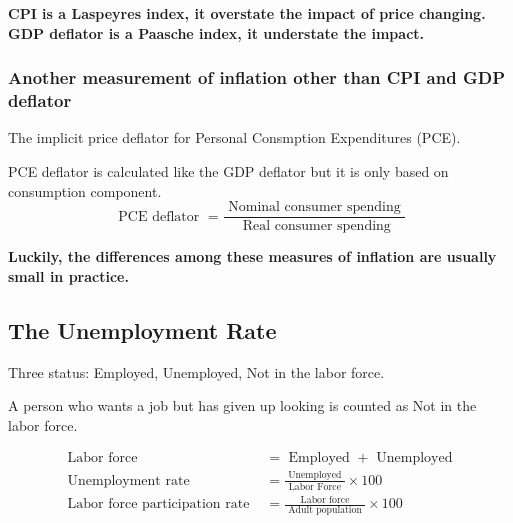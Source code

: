 \documentclass[12pt]{article}
\begin{document}
{\textbf {CPI is a Laspeyres index, it overstate the impact of price changing.}}\\
{\textbf {GDP deflator is a Paasche index, it understate the impact.}}


\subsubsection{Another measurement of inflation other than CPI and GDP deflator}
The implicit price deflator for Personal Consmption Expenditures (PCE).

PCE deflator is calculated like the GDP deflator but it is only based on consumption
component.
\begin{equation*}
\text{ PCE deflator } = \frac{\text{ Nominal consumer spending }}{\text{ Real 
consumer spending}}
\end{equation*}


{\textbf {Luckily, the differences among these measures of inflation are usually
small in practice.}}

\begin{figure}[H]
\end{figure}








\subsection{The Unemployment Rate}
Three status:
Employed, Unemployed, Not in the labor force.

A person who wants a job but has given up looking is counted as Not in the labor force.


\begin{align*}
\text{ Labor force } &= \text{ Employed }  + \text{ Unemployed }\\
\text{ Unemployment rate } &= \frac{\text{ Unemployed }}{\text{ Labor Force }} \times 
100\\
\text{ Labor force participation rate } &= 
\frac{\text{ Labor force }}{\text{ Adult population }} \times 100
\end{align*}
\end{document}
